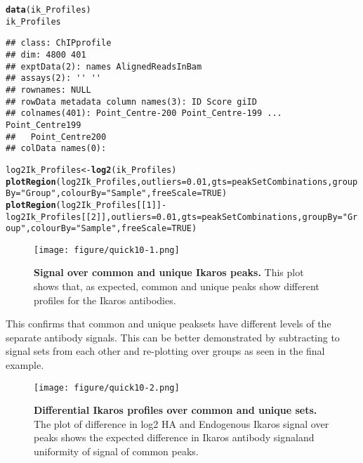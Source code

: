 \documentclass[12pt]{article}\usepackage[]{graphicx}\usepackage[usenames,dvipsnames]{color}
\makeatletter
\newcommand{\hlnum}[1]{\textcolor[rgb]{0.686,0.059,0.569}{#1}}%
\newcommand{\hlstr}[1]{\textcolor[rgb]{0.192,0.494,0.8}{#1}}%
\newcommand{\hlopt}[1]{\textcolor[rgb]{0,0,0}{#1}}%
\newcommand{\hlstd}[1]{\textcolor[rgb]{0.345,0.345,0.345}{#1}}%
\newcommand{\hlkwb}[1]{\textcolor[rgb]{0.69,0.353,0.396}{#1}}%
\newcommand{\hlkwc}[1]{\textcolor[rgb]{0.333,0.667,0.333}{#1}}%
\newcommand{\hlkwd}[1]{\textcolor[rgb]{0.737,0.353,0.396}{\textbf{#1}}}%
\newenvironment{kframe}{%
 \def\at@end@of@kframe{}%
 \ifinner\ifhmode%
  \def\at@end@of@kframe{\end{minipage}}%
  \begin{minipage}{\columnwidth}%
 \fi\fi%
 \def\FrameCommand##1{\hskip\@totalleftmargin \hskip-\fboxsep
 \colorbox{shadecolor}{##1}\hskip-\fboxsep
     \hskip-\linewidth \hskip-\@totalleftmargin \hskip\columnwidth}%
 \MakeFramed {\advance\hsize-\width
   \@totalleftmargin\z@ \linewidth\hsize
   \@setminipage}}%
 {\par\unskip\endMakeFramed%
 \at@end@of@kframe}
\newenvironment{knitrout}{}{} %
\makeatother
\begin{document}
\begin{knitrout}
\color{fgcolor}\begin{kframe}
\begin{alltt}
\hlkwd{data}\hlstd{(ik_Profiles)}
\hlstd{ik_Profiles}
\end{alltt}
\begin{verbatim}
## class: ChIPprofile 
## dim: 4800 401 
## exptData(2): names AlignedReadsInBam
## assays(2): '' ''
## rownames: NULL
## rowData metadata column names(3): ID Score giID
## colnames(401): Point_Centre-200 Point_Centre-199 ... Point_Centre199
##   Point_Centre200
## colData names(0):
\end{verbatim}
\begin{alltt}
\hlstd{log2Ik_Profiles} \hlkwb{<-} \hlkwd{log2}\hlstd{(ik_Profiles)}
\hlkwd{plotRegion}\hlstd{(log2Ik_Profiles,}\hlkwc{outliers}\hlstd{=}\hlnum{0.01}\hlstd{,}\hlkwc{gts}\hlstd{=peakSetCombinations,} \hlkwc{groupBy}\hlstd{=}\hlstr{"Group"}\hlstd{,}\hlkwc{colourBy}\hlstd{=}\hlstr{"Sample"}\hlstd{,} \hlkwc{freeScale}\hlstd{=}\hlnum{TRUE}\hlstd{)}
\hlkwd{plotRegion}\hlstd{(log2Ik_Profiles[[}\hlnum{1}\hlstd{]]} \hlopt{-} \hlstd{log2Ik_Profiles[[}\hlnum{2}\hlstd{]] ,}\hlkwc{outliers}\hlstd{=}\hlnum{0.01}\hlstd{,}\hlkwc{gts}\hlstd{=peakSetCombinations,} \hlkwc{groupBy}\hlstd{=}\hlstr{"Group"}\hlstd{,} \hlkwc{colourBy}\hlstd{=}\hlstr{"Sample"}\hlstd{,} \hlkwc{freeScale}\hlstd{=}\hlnum{TRUE}\hlstd{)}
\end{alltt}
\end{kframe}
\end{knitrout}


\begin{figure}
\centering
\texttt{[image: figure/quick10-1.png]}
\caption{
  \textbf{Signal over common and unique Ikaros peaks.} This plot shows that, as expected, common and unique peaks show different profiles for the Ikaros antibodies.
}
\label{IkExample}
\end{figure}


This confirms that common and unique peaksets have different levels of the separate antibody signals. This can be better demonstrated by subtracting to signal sets from each other and re-plotting over groups as seen in the final example.


\begin{figure}
\centering
\texttt{[image: figure/quick10-2.png]}
\caption{
  \textbf{Differential Ikaros profiles over common and unique sets.} 
  The plot of difference in log2 HA and Endogenous Ikaros signal over peaks shows the expected difference in Ikaros antibody signaland uniformity of signal of common peaks.
}
\label{DiffIkaros}
\end{figure}




\end{document}
